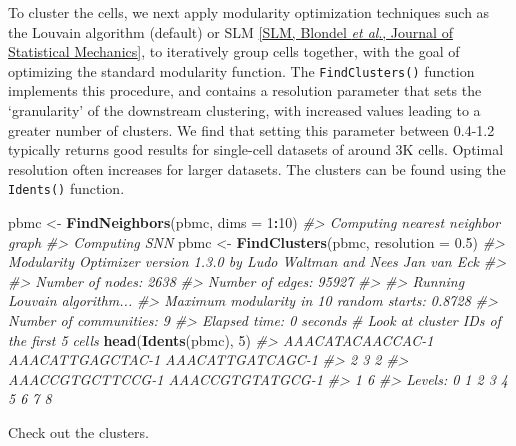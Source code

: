 \documentclass[
]{book}
\newenvironment{Shaded}{\begin{snugshade}}{\end{snugshade}}
\newcommand{\AttributeTok}[1]{\textcolor[rgb]{0.13,0.29,0.53}{#1}}
\newcommand{\CommentTok}[1]{\textcolor[rgb]{0.56,0.35,0.01}{\textit{#1}}}
\newcommand{\DecValTok}[1]{\textcolor[rgb]{0.00,0.00,0.81}{#1}}
\newcommand{\FloatTok}[1]{\textcolor[rgb]{0.00,0.00,0.81}{#1}}
\newcommand{\FunctionTok}[1]{\textcolor[rgb]{0.13,0.29,0.53}{\textbf{#1}}}
\newcommand{\NormalTok}[1]{#1}
\newcommand{\OtherTok}[1]{\textcolor[rgb]{0.56,0.35,0.01}{#1}}
\newcommand{\SpecialCharTok}[1]{\textcolor[rgb]{0.81,0.36,0.00}{\textbf{#1}}}
\begin{document}
To cluster the cells, we next apply modularity optimization techniques such as the Louvain algorithm (default) or SLM \href{http://dx.doi.org/10.1088/1742-5468/2008/10/P10008}{{[}SLM, Blondel \emph{et al}., Journal of Statistical Mechanics{]}}, to iteratively group cells together, with the goal of optimizing the standard modularity function. The \texttt{FindClusters()} function implements this procedure, and contains a resolution parameter that sets the `granularity' of the downstream clustering, with increased values leading to a greater number of clusters. We find that setting this parameter between 0.4-1.2 typically returns good results for single-cell datasets of around 3K cells. Optimal resolution often increases for larger datasets. The clusters can be found using the \texttt{Idents()} function.

\begin{Shaded}
\begin{Highlighting}[]
\NormalTok{pbmc }\OtherTok{\textless{}{-}} \FunctionTok{FindNeighbors}\NormalTok{(pbmc, }\AttributeTok{dims =} \DecValTok{1}\SpecialCharTok{:}\DecValTok{10}\NormalTok{)}
\CommentTok{\#\textgreater{} Computing nearest neighbor graph}
\CommentTok{\#\textgreater{} Computing SNN}
\NormalTok{pbmc }\OtherTok{\textless{}{-}} \FunctionTok{FindClusters}\NormalTok{(pbmc, }\AttributeTok{resolution =} \FloatTok{0.5}\NormalTok{)}
\CommentTok{\#\textgreater{} Modularity Optimizer version 1.3.0 by Ludo Waltman and Nees Jan van Eck}
\CommentTok{\#\textgreater{} }
\CommentTok{\#\textgreater{} Number of nodes: 2638}
\CommentTok{\#\textgreater{} Number of edges: 95927}
\CommentTok{\#\textgreater{} }
\CommentTok{\#\textgreater{} Running Louvain algorithm...}
\CommentTok{\#\textgreater{} Maximum modularity in 10 random starts: 0.8728}
\CommentTok{\#\textgreater{} Number of communities: 9}
\CommentTok{\#\textgreater{} Elapsed time: 0 seconds}
\CommentTok{\# Look at cluster IDs of the first 5 cells}
\FunctionTok{head}\NormalTok{(}\FunctionTok{Idents}\NormalTok{(pbmc), }\DecValTok{5}\NormalTok{)}
\CommentTok{\#\textgreater{} AAACATACAACCAC{-}1 AAACATTGAGCTAC{-}1 AAACATTGATCAGC{-}1 }
\CommentTok{\#\textgreater{}                2                3                2 }
\CommentTok{\#\textgreater{} AAACCGTGCTTCCG{-}1 AAACCGTGTATGCG{-}1 }
\CommentTok{\#\textgreater{}                1                6 }
\CommentTok{\#\textgreater{} Levels: 0 1 2 3 4 5 6 7 8}
\end{Highlighting}
\end{Shaded}

Check out the clusters.
\end{document}
